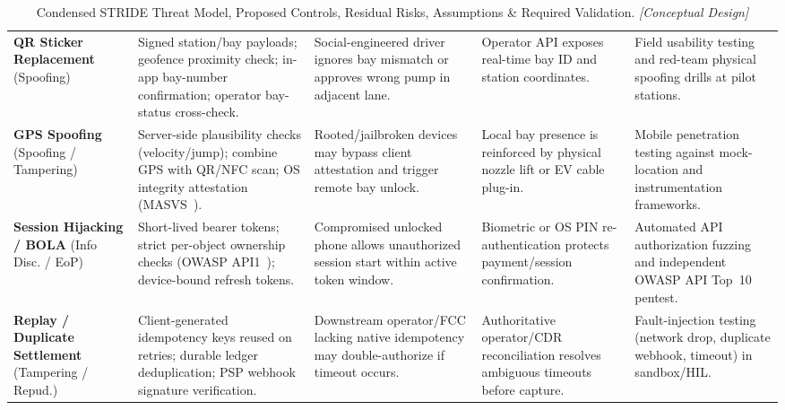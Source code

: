 \begin{table}[htbp]
  \centering
  \caption{Condensed STRIDE Threat Model, Proposed Controls, Residual Risks, Assumptions \& Required Validation. \emph{[Conceptual Design]}}
  \label{tab:stride-threats}
  {\footnotesize
  \begin{tabularx}{\linewidth}{@{}P{24mm} P{36mm} P{32mm} P{30mm} L@{}}
    \toprule
     &  &  &  &  \\
    \midrule
    \textbf{QR Sticker Replacement} (Spoofing) & Signed station/bay payloads; geofence proximity check; in-app bay-number confirmation; operator bay-status cross-check. & Social-engineered driver ignores bay mismatch or approves wrong pump in adjacent lane. & Operator API exposes real-time bay ID and station coordinates. & Field usability testing and red-team physical spoofing drills at pilot stations. \\
    \textbf{GPS Spoofing} (Spoofing / Tampering) & Server-side plausibility checks (velocity/jump); combine GPS with QR/NFC scan; OS integrity attestation (MASVS~\cite{owasp2024masvs}). & Rooted/jailbroken devices may bypass client attestation and trigger remote bay unlock. & Local bay presence is reinforced by physical nozzle lift or EV cable plug-in. & Mobile penetration testing against mock-location and instrumentation frameworks. \\
    \textbf{Session Hijacking / BOLA} (Info Disc. / EoP) & Short-lived bearer tokens; strict per-object ownership checks (OWASP API1~\cite{owasp2023apitop10}); device-bound refresh tokens. & Compromised unlocked phone allows unauthorized session start within active token window. & Biometric or OS PIN re-authentication protects payment/session confirmation. & Automated API authorization fuzzing and independent OWASP API Top~10 pentest. \\
    \textbf{Replay / Duplicate Settlement} (Tampering / Repud.) & Client-generated idempotency keys reused on retries; durable ledger deduplication; PSP webhook signature verification. & Downstream operator/FCC lacking native idempotency may double-authorize if timeout occurs. & Authoritative operator/CDR reconciliation resolves ambiguous timeouts before capture. & Fault-injection testing (network drop, duplicate webhook, timeout) in sandbox/HIL. \\

\end{tabularx}}
\end{table}
